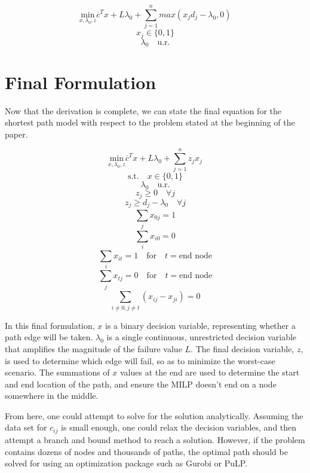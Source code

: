 \documentclass{article}
\begin{document}
$$
\underset{x,\lambda_0,z}{\textrm{min}} \overline{c}^T x + L \lambda_0 + \sum_{j = 1}^{n} max \left(x_j d_j - \lambda_0 ,0\right)
$$
$$
x_j \in \{0,1\}
$$
$$
\lambda_0 \quad \textrm{u.r.}
$$

\section{Final Formulation}
Now that the derivation is complete, we can state the final equation for the shortest path model with respect to the problem stated at the beginning of the paper. 

$$
\underset{x,\lambda_0,z}{\textrm{min}} \overline{c}^T x + L \lambda_0 + \sum_{j = 1}^{n} z_{j} x_{j}
$$
$$
\textrm{s.t.} \quad x \in \{0,1\}
$$
$$
\lambda_0 \quad \textrm{u.r.}
$$
$$
z_{j} \geq 0 \quad \forall j
$$
$$
z_{j} \geq d_{j} - \lambda_0 \quad \forall j
$$
$$
\sum_{j}^{} x_{0j} = 1
$$
$$
\sum_{i}^{} x_{i0} = 0
$$
$$
\sum_{i}^{} x_{it} = 1 \quad \textrm{for} \quad t = \textrm{end node}
$$
$$
\sum_{j}^{} x_{tj} = 0 \quad \textrm{for} \quad t = \textrm{end node}
$$
$$
\sum_{i \neq 0, j \neq t}^{} \left( x_{ij} - x_{ji} \right) = 0
$$

In this final formulation, $x$ is a binary decision variable, representing whether a path edge will be taken. $\lambda_0$ is a single continuous, unrestricted decision variable that amplifies the magnitude of the failure value $L$. The final decision variable, $z$, is used to determine which edge will fail, so as to minimize the worst-case scenario. The summations of $x$ values at the end are used to determine the start and end location of the path, and ensure the MILP doesn't end on a node somewhere in the middle.

From here, one could attempt to solve for the solution analytically. Assuming the data set for $c_{ij}$ is small enough, one could relax the decision variables, and then attempt a branch and bound method to reach a solution. However, if the problem contains dozens of nodes and thousands of paths, the optimal path should be solved for using an optimization package such as Gurobi or PuLP. 
\end{document}
